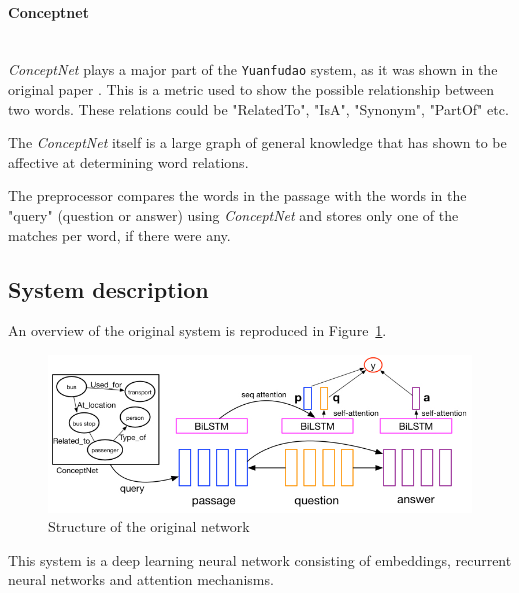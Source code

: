 \paragraph*{Conceptnet} \cite{Speer:2017} \\

\textit{ConceptNet} plays a major part of the \texttt{Yuanfudao} system, as it was shown in the original paper \cite{Wang:2018}. This is a metric  used to show the possible relationship between two words. These relations could be "RelatedTo", "IsA", "Synonym", "PartOf" etc. 

The \textit{ConceptNet} itself is a large graph of general knowledge that has shown to be affective at determining word relations.

The preprocessor compares the words in the passage with the words in the "query" (question or answer) using \textit{ConceptNet} and stores only one of the matches per word, if there were any.


\subsection{System description}

An overview of the original system is reproduced in Figure~\ref{fig:dnn}.
\begin{figure}[h!]
	\centering
	\includegraphics[scale=0.5]{TriAN.jpg}
	\caption{Structure of the original network \cite{Wang:2018}}
	\label{fig:dnn}
\end{figure}

This system is a deep learning neural network consisting of embeddings, recurrent neural networks and attention mechanisms.


